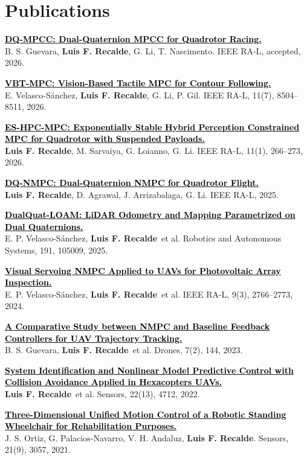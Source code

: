 \documentclass[letterpaper,11pt]{article}
\newcommand{\authorname}{\textcolor{AuthorTeal}{\textbf{Luis F. Recalde}}}
\newcommand{\journal}[1]{\textcolor{HeadingNavy}{#1}}
\newcommand{\papertitle}[1]{\textcolor{black}{\textbf{#1}}}
\begin{document}
\section{Publications}
\begin{enumerate}[leftmargin=0.28in, label={[\arabic*]}, itemsep=3pt, parsep=0pt, topsep=3pt]
\small
\item \href{https://arxiv.org/abs/2609.36482}{\papertitle{DQ-MPCC: Dual-Quaternion MPCC for Quadrotor Racing.}}\\
B. S. Guevara, \authorname, G. Li, T. Nascimento. \journal{IEEE RA-L}, accepted, 2026.
\item \href{https://doi.org/10.1109/LRA.2026.3698362}{\papertitle{VBT-MPC: Vision-Based Tactile MPC for Contour Following.}}\\
E. Velasco-S\'anchez, \authorname, G. Li, P. Gil. \journal{IEEE RA-L}, 11(7), 8504--8511, 2026.
\item \href{https://doi.org/10.1109/LRA.2025.3632070}{\papertitle{ES-HPC-MPC: Exponentially Stable Hybrid Perception Constrained MPC for Quadrotor with Suspended Payloads.}}\\
\authorname, M. Sarvaiya, G. Loianno, G. Li. \journal{IEEE RA-L}, 11(1), 266--273, 2026.
\item \href{https://doi.org/10.1109/LRA.2025.3623022}{\papertitle{DQ-NMPC: Dual-Quaternion NMPC for Quadrotor Flight.}}\\
\authorname, D. Agrawal, J. Arrizabalaga, G. Li. \journal{IEEE RA-L}, 2025.
\item \href{https://doi.org/10.1016/j.robot.2025.105009}{\papertitle{DualQuat-LOAM: LiDAR Odometry and Mapping Parametrized on Dual Quaternions.}}\\
E. P. Velasco-S\'anchez, \authorname\ et al. \journal{Robotics and Autonomous Systems}, 191, 105009, 2025.
\item \href{https://doi.org/10.1109/LRA.2024.3360876}{\papertitle{Visual Servoing NMPC Applied to UAVs for Photovoltaic Array Inspection.}}\\
E. P. Velasco-S\'anchez, \authorname\ et al. \journal{IEEE RA-L}, 9(3), 2766--2773, 2024.
\item \href{https://doi.org/10.3390/drones7020144}{\papertitle{A Comparative Study between NMPC and Baseline Feedback Controllers for UAV Trajectory Tracking.}}\\
B. S. Guevara, \authorname\ et al. \journal{Drones}, 7(2), 144, 2023.
\item \href{https://doi.org/10.3390/s22134712}{\papertitle{System Identification and Nonlinear Model Predictive Control with Collision Avoidance Applied in Hexacopters UAVs.}}\\
\authorname\ et al. \journal{Sensors}, 22(13), 4712, 2022.
\item \href{https://doi.org/10.3390/s21093057}{\papertitle{Three-Dimensional Unified Motion Control of a Robotic Standing Wheelchair for Rehabilitation Purposes.}}\\
J. S. Ortiz, G. Palacios-Navarro, V. H. Andaluz, \authorname. \journal{Sensors}, 21(9), 3057, 2021.
\end{enumerate}
\end{document}
